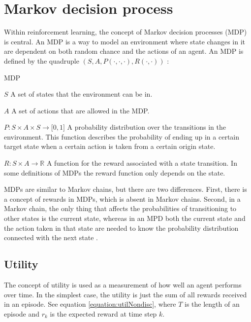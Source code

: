 \section{Markov decision process}
\label{sec:mdps}

Within reinforcement learning, the concept of Markov decision processes (MDP) is central. An MDP is a way to model an environment where state changes in it are dependent on both random chance and the actions of an agent. An MDP is defined by the quadruple $\left( S, A, P( \cdot , \cdot, \cdot ) , R( \cdot , \cdot ) \right)$ \parencite{altman2002applications}:

\begin{definition}{MDP}

$S$ \quad A set of states that the environment can be in.

$A$ \quad A set of actions that are allowed in the MDP.

$P \colon S \times A \times S \to \mathbb \lbrack0, 1\rbrack$ \quad
    A probability distribution over the transitions in the environment. This
    function describes the probability of ending up in a certain target state
    when a certain action is taken from a certain origin state. 

$R \colon S \times A \to \mathbb{R}$ \quad
    A function for the reward associated with a state transition. In some
    definitions of MDPs the reward function only depends on the state.
\end{definition}

MDPs are similar to Markov chains, but there are two differences. First, there
is a concept of rewards in MDPs, which is absent in Markov chains. Second, in a
Markov chain, the only thing that affects the probabilities of transitioning to
other states is the current state, whereas in an MPD both the current state and
the action taken in that state are needed to know the probability distribution
connected with the next state \parencite{altman2002applications}.

\subsection{Utility}
\label{theBestLabelEvah}
\label{sec:utility}


The concept of utility is used as a measurement of how well an agent performs
over time. In the simplest case, the utility is just the sum of all rewards
received in an episode. See equation \eqref{equation:utilNondisc}, where $T$ is the
length of an episode and $r_k$ is the expected reward at time step $k$.

